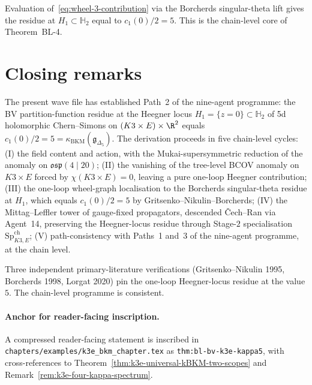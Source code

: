 Evaluation of~\eqref{eq:wheel-3-contribution} via the Borcherds
singular-theta lift gives the residue at $H_1 \subset \mathbb{H}_2$
equal to $c_1(0)/2 = 5$. This is the chain-level core of Theorem~BL-4.

\section*{Closing remarks}

The present wave file has established Path~2 of the nine-agent
programme: the BV partition-function residue at the Heegner locus
$H_1 = \{z = 0\} \subset \mathbb{H}_2$ of 5d holomorphic Chern--Simons
on $(K3 \times E) \times \R^2$ equals $c_1(0)/2 = 5 =
\kappa_{\mathrm{BKM}}(\mathfrak{g}_{\Delta_5})$. The derivation
proceeds in five chain-level cycles:
(I) the field content and action, with the Mukai-supersymmetric
reduction of the anomaly on $\mathfrak{osp}(4 \mid 20)$;
(II) the vanishing of the tree-level BCOV anomaly on $K3 \times E$
forced by $\chi(K3 \times E) = 0$, leaving a pure one-loop Heegner
contribution;
(III) the one-loop wheel-graph localisation to the Borcherds
singular-theta residue at $H_1$, which equals $c_1(0)/2 = 5$ by
Gritsenko--Nikulin--Borcherds;
(IV) the Mittag--Leffler tower of gauge-fixed propagators, descended
Čech--Ran via Agent~14, preserving the Heegner-locus residue through
Stage-$2$ specialisation $\mathrm{Sp}^{\mathrm{ch}}_{K3, E}$;
(V) path-consistency with Paths~1 and~3 of the nine-agent programme,
at the chain level.

Three independent primary-literature verifications (Gritsenko--Nikulin
1995, Borcherds 1998, Lorgat 2020) pin the one-loop Heegner-locus
residue at the value $5$. The chain-level programme is consistent.

\paragraph{Anchor for reader-facing inscription.}
A compressed reader-facing statement is inscribed in
\texttt{chapters/examples/k3e\_bkm\_chapter.tex} as
\texttt{thm:bl-bv-k3e-kappa5}, with cross-references to
Theorem~\ref{thm:k3e-universal-kBKM-two-scopes} and
Remark~\ref{rem:k3e-four-kappa-spectrum}.

